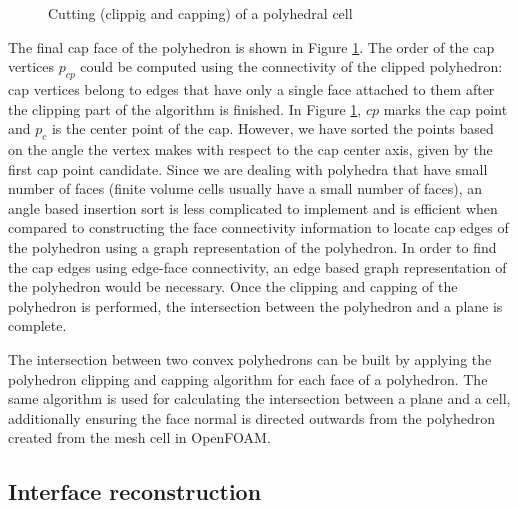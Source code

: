 \begin{figure}
    \centering
    \def\svgwidth{0.5\columnwidth}
       {\footnotesize
        
       }
    \caption{Cutting (clippig and capping) of a polyhedral cell}
    \label{fig:cap}
\end{figure}

The final cap face of the polyhedron is shown in Figure \ref{fig:cap}. The
order of the cap vertices $p_{cp}$ could be computed using the connectivity of
the clipped polyhedron: cap vertices belong to edges that have only a single
face attached to them after the clipping part of the algorithm is finished. In
Figure \ref{fig:cap}, $cp$ marks the cap point and $p_{c}$ is the center
point of the cap. However, we have sorted the points based on the angle the
vertex makes with respect to the cap center axis, given by the first cap point
candidate. Since we are dealing with polyhedra that have small number of faces
(finite volume cells usually have a small number of faces), an angle based
insertion sort is less complicated to implement and is efficient when compared
to constructing the face connectivity information to locate cap edges of the
polyhedron using a graph representation of the polyhedron. In order to find the
cap edges using edge-face connectivity, an edge based graph representation of
the polyhedron would be necessary. Once the clipping and capping of the
polyhedron is performed, the intersection between the polyhedron and a plane is
complete. 

The intersection between two convex polyhedrons can be built by applying the
polyhedron clipping and capping algorithm for each face of a polyhedron. The
same algorithm is used for calculating the intersection between a plane and a
cell, additionally ensuring the face normal is directed outwards from the
polyhedron created from the mesh cell in OpenFOAM. 

\subsection{Interface reconstruction}

